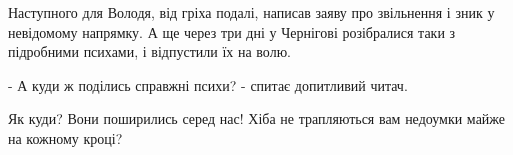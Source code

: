 Наступного для Володя, від гріха подалі, написав заяву про звільнення і зник у
невідомому напрямку. А ще через три дні у Чернігові розібралися таки з
підробними психами, і відпустили їх на волю.

- А куди ж поділись справжні психи? - спитає допитливий читач.

Як куди? Вони поширились серед нас! Хіба не трапляються вам недоумки майже на
кожному кроці?


